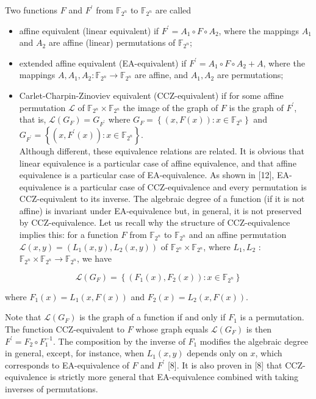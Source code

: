 \documentclass[10pt]{article}
\begin{document}
Two functions $F$ and $F^{\prime}$ from $\mathbb{F}_{2^{n}}$ to $\mathbb{F}_{2^{n}}$ are called

\begin{itemize}
  \item affine equivalent (linear equivalent) if $F^{\prime}=A_{1} \circ F \circ A_{2}$, where the mappings $A_{1}$ and $A_{2}$ are affine (linear) permutations of $\mathbb{F}_{2^{n}}$;
  \item extended affine equivalent (EA-equivalent) if $F^{\prime}=A_{1} \circ F \circ A_{2}+A$, where the mappings $A, A_{1}, A_{2}: \mathbb{F}_{2^{n}} \rightarrow \mathbb{F}_{2^{n}}$ are affine, and $A_{1}, A_{2}$ are permutations;
  \item Carlet-Charpin-Zinoviev equivalent (CCZ-equivalent) if for some affine permutation $\mathcal{L}$ of $\mathbb{F}_{2^{n}} \times \mathbb{F}_{2^{n}}$ the image of the graph of $F$ is the graph of $F^{\prime}$, that is, $\mathcal{L}\left(G_{F}\right)= G_{F^{\prime}}$ where $G_{F}=\left\{(x, F(x)): x \in \mathbb{F}_{2^{n}}\right\}$ and $G_{F^{\prime}}= \left\{\left(x, F^{\prime}(x)\right): x \in \mathbb{F}_{2^{n}}\right\}$.\\[0pt]
Although different, these equivalence relations are related. It is obvious that linear equivalence is a particular case of affine equivalence, and that affine equivalence is a particular case of EA-equivalence. As shown in [12], EA-equivalence is a particular case of CCZ-equivalence and every permutation is CCZ-equivalent to its inverse. The algebraic degree of a function (if it is not affine) is invariant under EA-equivalence but, in general, it is not preserved by CCZ-equivalence. Let us recall why the structure of CCZ-equivalence implies this: for a function $F$ from $\mathbb{F}_{2^{n}}$ to $\mathbb{F}_{2^{n}}$ and an affine permutation $\mathcal{L}(x, y)=\left(L_{1}(x, y), L_{2}(x, y)\right)$ of $\mathbb{F}_{2^{n}} \times \mathbb{F}_{2^{n}}$, where $L_{1}, L_{2}$ : $\mathbb{F}_{2^{n}} \times \mathbb{F}_{2^{n}} \rightarrow \mathbb{F}_{2^{n}}$, we have
\end{itemize}


\begin{equation*}
\mathcal{L}\left(G_{F}\right)=\left\{\left(F_{1}(x), F_{2}(x)\right): x \in \mathbb{F}_{2^{n}}\right\} \tag{1}
\end{equation*}


where $F_{1}(x)=L_{1}(x, F(x))$ and $F_{2}(x)=L_{2}(x, F(x))$.

Note that $\mathcal{L}\left(G_{F}\right)$ is the graph of a function if and only if $F_{1}$ is a permutation. The function CCZ-equivalent to $F$ whose graph equals $\mathcal{L}\left(G_{F}\right)$ is then $F^{\prime}=F_{2} \circ F_{1}^{-1}$. The composition by the inverse of $F_{1}$ modifies the algebraic degree in general, except, for instance, when $L_{1}(x, y)$ depends only on $x$, which corresponds to EA-equivalence of $F$ and $F^{\prime}$ [8]. It is also proven in [8] that CCZ-equivalence is strictly more general that EA-equivalence combined with taking inverses of permutations.
\end{document}
